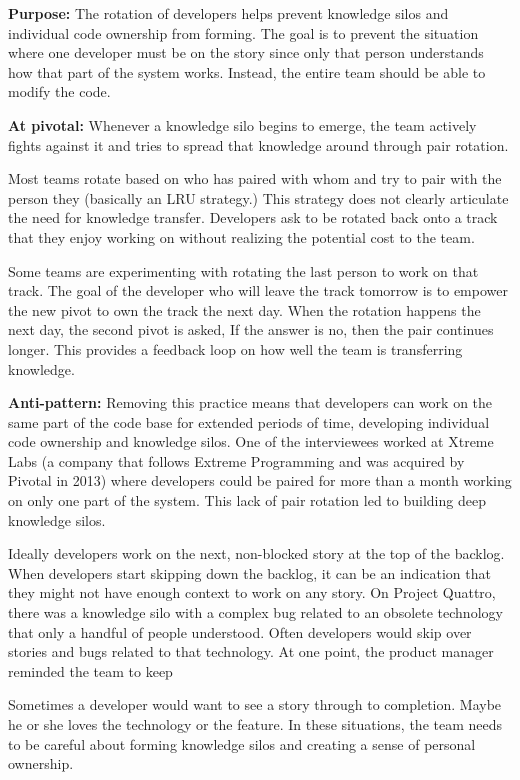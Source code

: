 \begin{table}[]
\textbf{Purpose:} The rotation of developers helps prevent knowledge silos and individual code ownership from forming. The goal is to prevent the situation where one developer must be on the story since only that person understands how that part of the system works. Instead, the entire team should be able to modify the code. 

\textbf{At pivotal:} Whenever a knowledge silo begins to emerge, the team actively fights against it and tries to spread that knowledge around through pair rotation. 

Most teams rotate based on who has paired with whom and try to pair with the person they  (basically an LRU strategy.) This strategy does not clearly articulate the need for knowledge transfer. Developers ask to be rotated back onto a track that they enjoy working on without realizing the potential cost to the team. 

Some teams are experimenting with rotating the last person to work on that track. The goal of the developer who will leave the track tomorrow is to empower the new pivot to own the track the next day. When the rotation happens the next day, the second pivot is asked,  If the answer is no, then the pair continues longer. This provides a feedback loop on how well the team is transferring knowledge.  

\textbf{Anti-pattern:} Removing this practice means that developers can work on the same part of the code base for extended periods of time, developing individual code ownership and knowledge silos. One of the interviewees worked at Xtreme Labs (a company that follows Extreme Programming and was acquired by Pivotal in 2013) where developers could be paired for more than a month working on only one part of the system. This lack of pair rotation led to building deep knowledge silos. 

Ideally developers work on the next, non-blocked story at the top of the backlog. When developers start skipping down the backlog, it can be an indication that they might not have enough context to work on any story. On Project Quattro, there was a knowledge silo with a complex bug related to an obsolete technology that only a handful of people understood. Often developers would skip over stories and bugs related to that technology. At one point, the product manager reminded the team to keep 

Sometimes a developer would want to see a story through to completion. Maybe he or she loves the technology or the feature. In these situations, the team needs to be careful about forming knowledge silos and creating a sense of personal ownership.


\end{table}

